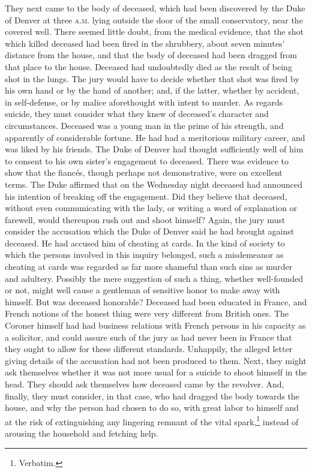 They next came to the body of deceased, which had been discovered by the Duke of Denver at three \textsc{a.m.} lying outside the door of the small conservatory, near the covered well. There seemed little doubt, from the medical evidence, that the shot which killed deceased had been fired in the shrubbery, about seven minutes' distance from the house, and that the body of deceased had been dragged from that place to the house. Deceased had undoubtedly died as the result of being shot in the lungs. The jury would have to decide whether that shot was fired by his own hand or by the hand of another; and, if the latter, whether by accident, in self-defense, or by malice aforethought with intent to murder. As regards suicide, they must consider what they knew of deceased's character and circumstances. Deceased was a young man in the prime of his strength, and apparently of considerable fortune. He had had a meritorious military career, and was liked by his friends. The Duke of Denver had thought sufficiently well of him to consent to his own sister's engagement to deceased. There was evidence to show that the fiancés, though perhaps not demonstrative, were on excellent terms.  The Duke affirmed that on the Wednesday night deceased had announced his intention of breaking off the engagement. Did they believe that deceased, without even communicating with the lady, or writing a word of explanation or farewell, would thereupon rush out and shoot himself?  Again, the jury must consider the accusation which the Duke of Denver said he had brought against deceased. He had accused him of cheating at cards. In the kind of society to which the persons involved in this inquiry belonged, such a misdemeanor as cheating at cards was regarded as far more shameful than such sins as murder and adultery.  Possibly the mere suggestion of such a thing, whether well-founded or not, might well cause a gentleman of sensitive honor to make away with himself. But was deceased honorable? Deceased had been educated in France, and French notions of the honest thing were very different from British ones. The Coroner himself had had business relations with French persons in his capacity as a solicitor, and could assure such of the jury as had never been in France that they ought to allow for these different standards. Unhappily, the alleged letter giving details of the accusation had not been produced to them. Next, they might ask themselves whether it was not more usual for a suicide to shoot himself in the head. They should ask themselves how deceased came by the revolver. And, finally, they must consider, in that case, who had dragged the body towards the house, and why the person had chosen to do so, with great labor to himself and at the risk of extinguishing any lingering remnant of the vital spark,\footnote{Verbatim.} instead of arousing the household and fetching help.

